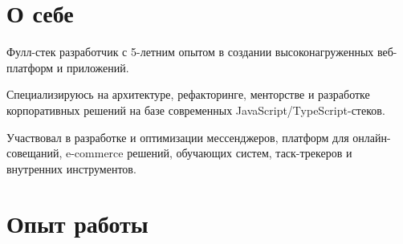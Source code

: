\documentclass[a4paper,12pt]{article}
\begin{document}
\vspace*{-2em}

\begin{minipage}[t]{0.62\textwidth}
  \vspace*{-0.22em}
  \section*{О себе}
 Фулл-стек разработчик с 5-летним опытом в создании высоконагруженных веб-платформ и приложений.

  \vspace{0.8em}

 Специализируюсь на архитектуре, рефакторинге, менторстве и разработке корпоративных решений на базе современных JavaScript/TypeScript-стеков.

  \vspace{0.8em}
  Участвовал в разработке и оптимизации мессенджеров, платформ для онлайн-совещаний, e-commerce решений, обучающих систем, таск-трекеров и внутренних инструментов.

  \vspace*{0.8em}

  \section*{Опыт работы}


\end{minipage}
\end{document}
